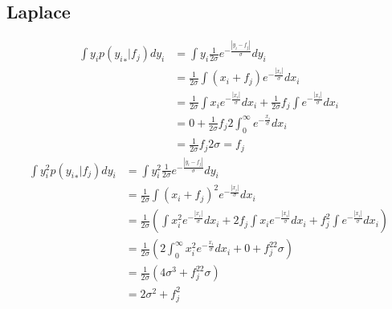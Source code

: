 \documentclass[5p,11pt]{article}
\begin{document}
\subsection{Laplace}
\begin{equation}
    \begin{aligned}
        \int y_i p({y_i}_*|f_j)dy_i &= \int y_i \frac{1}{2\sigma} e^{-\frac{|y_i-f_j|}{\sigma}} dy_i\\
        &= \frac{1}{2\sigma} \int (x_i+f_j) e^{-\frac{|x_i|}{\sigma}} dx_i\\
        &= \frac{1}{2\sigma} \int x_i e^{-\frac{|x_i|}{\sigma}} dx_i + \frac{1}{2\sigma}f_j \int e^{-\frac{|x_i|}{\sigma}} dx_i\\
        &= 0 + \frac{1}{2\sigma} f_j 2\int_0^{\infty} e^{-\frac{x_i}{\sigma}} dx_i\\
        &= \frac{1}{2\sigma}f_j2\sigma = f_j
    \end{aligned}
\end{equation}
\begin{equation}
    \begin{aligned}
        \int y_i^2 p({y_i}_*|f_j)dy_i &= \int y_i^2 \frac{1}{2\sigma} e^{-\frac{|y_i-f_j|}{\sigma}} dy_i\\
        &= \frac{1}{2\sigma} \int (x_i+f_j)^2 e^{-\frac{|x_i|}{\sigma}} dx_i\\
        &= \frac{1}{2\sigma} \left( \int x_i^2 e^{-\frac{|x_i|}{\sigma}} dx_i + 2f_j\int x_i e^{-\frac{|x_i|}{\sigma}} dx_i + f_j^2\int e^{-\frac{|x_i|}{\sigma}} dx_i\right)\\
        &= \frac{1}{2\sigma} \left( 2\int_0^{\infty} x_i^2 e^{-\frac{x_i}{\sigma}} dx_i + 0 + f_j^22\sigma\right)\\
        &= \frac{1}{2\sigma} \left( 4\sigma^3 + f_j^22\sigma\right)\\
        &= 2\sigma^2 + f_j^2\\
    \end{aligned}
\end{equation}
\end{document}
